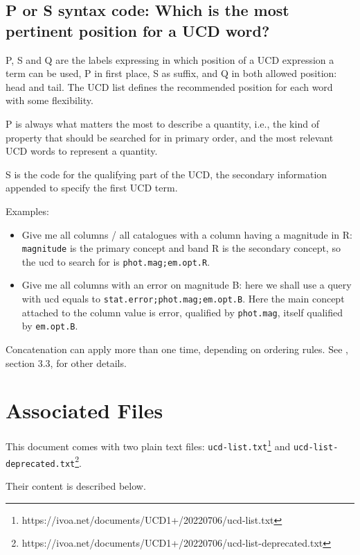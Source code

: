 \documentclass[11pt,a4paper]{ivoa}
\begin{document}
\subsection{P or S syntax code: Which is the most pertinent position for a UCD word?}
P, S and Q are the labels expressing in which position of a UCD expression a term can be used, P 
in first place, S as suffix, and Q in both allowed position: head and tail. The UCD list defines 
the recommended position for each word with some flexibility.

P is always what matters the most to describe a quantity, i.e., the kind of property that should be 
searched for in primary order, and the most relevant UCD words to represent a quantity.

S is the code for the qualifying part of the UCD, the secondary information appended to specify 
the first UCD term.

Examples:
\begin{itemize}
\item Give me all columns / all catalogues with a column having a magnitude in R: {\tt magnitude} 
is the primary concept and band R is the secondary concept, so the ucd to search for is 
{\tt phot.mag;em.opt.R}.
\item Give me all columns with an error on magnitude B: here we shall use a query with ucd 
equals to {\tt stat.error;phot.mag;em.opt.B}. Here the main concept attached to the column 
value is error, qualified by {\tt phot.mag}, itself qualified by {\tt em.opt.B}.
\end{itemize}
Concatenation can apply more than one time, depending on ordering rules. See \citet{2005ivoa.spec.0819D}, section 3.3, 
for other details.

\section{Associated Files}
This document comes with two plain text files:
\texttt{ucd-list.txt}\footnote{https://ivoa.net/documents/UCD1+/20220706/ucd-list.txt} and 
\texttt{ucd-list-deprecated.txt}\footnote{https://ivoa.net/documents/UCD1+/20220706/ucd-list-deprecated.txt}. 

Their content is described below. 
\end{document}
